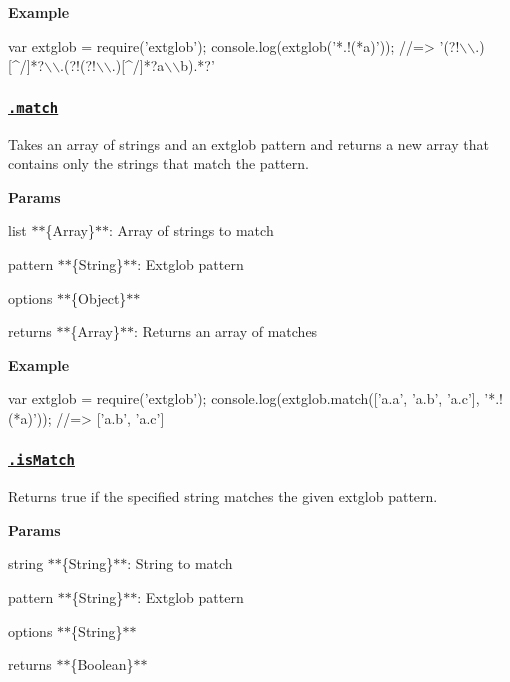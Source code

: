 {\bfseries Example}


\begin{DoxyCode}
var extglob = require('extglob');
console.log(extglob('*.!(*a)'));
//=> '(?!\(\backslash\)\(\backslash\).)[^/]*?\(\backslash\)\(\backslash\).(?!(?!\(\backslash\)\(\backslash\).)[^/]*?a\(\backslash\)\(\backslash\)b).*?'
\end{DoxyCode}


\subsubsection*{\href{index.js#L56}{\tt .match}}

Takes an array of strings and an extglob pattern and returns a new array that contains only the strings that match the pattern.

{\bfseries Params}


\begin{DoxyItemize}
\item {\ttfamily list} $\ast$$\ast$\{Array\}$\ast$$\ast$\+: Array of strings to match
\item {\ttfamily pattern} $\ast$$\ast$\{String\}$\ast$$\ast$\+: Extglob pattern
\item {\ttfamily options} $\ast$$\ast$\{Object\}$\ast$$\ast$
\item {\ttfamily returns} $\ast$$\ast$\{Array\}$\ast$$\ast$\+: Returns an array of matches
\end{DoxyItemize}

{\bfseries Example}


\begin{DoxyCode}
var extglob = require('extglob');
console.log(extglob.match(['a.a', 'a.b', 'a.c'], '*.!(*a)'));
//=> ['a.b', 'a.c']
\end{DoxyCode}


\subsubsection*{\href{index.js#L111}{\tt .is\+Match}}

Returns true if the specified {\ttfamily string} matches the given extglob {\ttfamily pattern}.

{\bfseries Params}


\begin{DoxyItemize}
\item {\ttfamily string} $\ast$$\ast$\{String\}$\ast$$\ast$\+: String to match
\item {\ttfamily pattern} $\ast$$\ast$\{String\}$\ast$$\ast$\+: Extglob pattern
\item {\ttfamily options} $\ast$$\ast$\{String\}$\ast$$\ast$
\item {\ttfamily returns} $\ast$$\ast$\{Boolean\}$\ast$$\ast$
\end{DoxyItemize}

